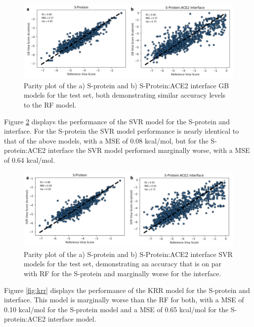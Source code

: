 \documentclass[11pt]{article}
\begin{document}
   \begin{figure}
     \centering
     \includegraphics[width=160mm]{gb}
     \caption{Parity plot of the a) S-protein and b) S-Protein:ACE2 interface GB models for the test set, both demonstrating similar accuracy levels to the RF model.}
     \label{fig:gb}
   \end{figure} 
      
   Figure \ref{fig:svr} displays the performance of the SVR model for the S-protein and interface. For the S-protein the SVR model performance is nearly identical to that of the above models, with a MSE of 0.08 kcal/mol, but for the S-protein:ACE2 interface the SVR model performed marginally worse, with a MSE of 0.64 kcal/mol. 
   
   \begin{figure}
     \centering
     \includegraphics[width=160mm]{svr}
     \caption{Parity plot of the a) S-protein and b) S-Protein:ACE2 interface SVR models for the test set, demonstrating an accuracy that is on par with RF for the S-protein and marginally worse for the interface.}
     \label{fig:svr}
   \end{figure} 
   
   Figure \ref{fig:krr} displays the performance of the KRR model for the S-protein and interface. This model is marginally worse than the RF for both, with a MSE of 0.10 kcal/mol for the S-protein model and a MSE of 0.65 kcal/mol for the S-protein:ACE2 interface model. 
   
\end{document}
